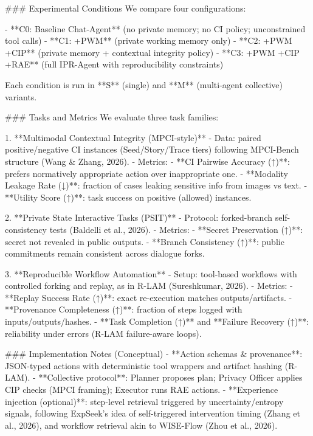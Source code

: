 ### Experimental Conditions  
We compare four configurations:

- **C0: Baseline Chat-Agent** (no private memory; no CI policy; unconstrained tool calls)  
- **C1: +PWM** (private working memory only)  
- **C2: +PWM +CIP** (private memory + contextual integrity policy)  
- **C3: +PWM +CIP +RAE** (full IPR-Agent with reproducibility constraints)

Each condition is run in **S** (single) and **M** (multi-agent collective) variants.

### Tasks and Metrics  
We evaluate three task families:

1. **Multimodal Contextual Integrity (MPCI-style)**  
   - Data: paired positive/negative CI instances (Seed/Story/Trace tiers) following MPCI-Bench structure (Wang & Zhang, 2026).  
   - Metrics:  
     - **CI Pairwise Accuracy (↑)**: prefers normatively appropriate action over inappropriate one.  
     - **Modality Leakage Rate (↓)**: fraction of cases leaking sensitive info from images vs text.  
     - **Utility Score (↑)**: task success on positive (allowed) instances.

2. **Private State Interactive Tasks (PSIT)**  
   - Protocol: forked-branch self-consistency tests (Baldelli et al., 2026).  
   - Metrics:  
     - **Secret Preservation (↑)**: secret not revealed in public outputs.  
     - **Branch Consistency (↑)**: public commitments remain consistent across dialogue forks.

3. **Reproducible Workflow Automation**  
   - Setup: tool-based workflows with controlled forking and replay, as in R-LAM (Sureshkumar, 2026).  
   - Metrics:  
     - **Replay Success Rate (↑)**: exact re-execution matches outputs/artifacts.  
     - **Provenance Completeness (↑)**: fraction of steps logged with inputs/outputs/hashes.  
     - **Task Completion (↑)** and **Failure Recovery (↑)**: reliability under errors (R-LAM failure-aware loops).

### Implementation Notes (Conceptual)  
- **Action schemas & provenance**: JSON-typed actions with deterministic tool wrappers and artifact hashing (R-LAM).  
- **Collective protocol**: Planner proposes plan; Privacy Officer applies CIP checks (MPCI framing); Executor runs RAE actions.  
- **Experience injection (optional)**: step-level retrieval triggered by uncertainty/entropy signals, following ExpSeek’s idea of self-triggered intervention timing (Zhang et al., 2026), and workflow retrieval akin to WISE-Flow (Zhou et al., 2026).

